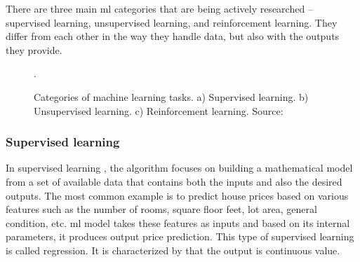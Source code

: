         There are three \cite{shalev2014understanding} main \gls{ml} categories that are being actively researched -- supervised learning, unsupervised learning, and reinforcement learning. They differ from each other in the way they handle data, but also with the outputs they provide.
        
        \begin{figure}[h]
            \centering
            \qquad
            \qquad
            \caption{Categories of machine learning tasks. a) Supervised learning. b) Unsupervised learning. c) Reinforcement learning. Source: \cite{kuramasupervisedunsupervised, wiki:reinforcementlearning}}.
            \label{fig:ml categories}
        \end{figure}
        
        \subsubsection{Supervised learning}
            In supervised learning \cite{bishop2006pattern, shalev2014understanding, witten2016data}, the algorithm focuses on building a mathematical model from a set of available data that contains both the inputs and also the desired outputs. The most common example is to predict house prices based on various features such as the number of rooms, square floor feet, lot area, general condition, etc. \Gls{ml} model takes these features as inputs and based on its internal parameters, it produces output price prediction. This type of supervised learning is called regression. It is characterized by that the output is continuous value. 
            
